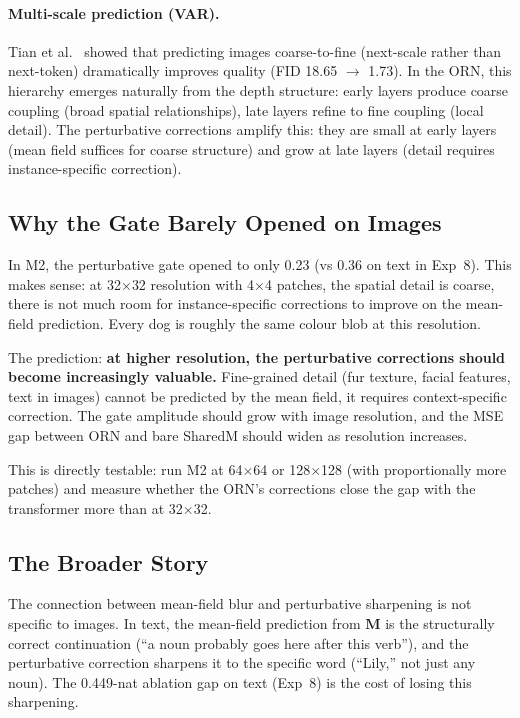 \documentclass[11pt, a4paper]{article}
\newcommand{\M}{\mathbf{M}}
\theoremstyle{plain}
\theoremstyle{remark}
\begin{document}
\paragraph{Multi-scale prediction (VAR).}
Tian et al.~\cite{tian2024var} showed that predicting images coarse-to-fine (next-scale rather than next-token) dramatically improves quality (FID 18.65 $\to$ 1.73).
In the ORN, this hierarchy emerges naturally from the depth structure: early layers produce coarse coupling (broad spatial relationships), late layers refine to fine coupling (local detail).
The perturbative corrections amplify this: they are small at early layers (mean field suffices for coarse structure) and grow at late layers (detail requires instance-specific correction).

\subsection{Why the Gate Barely Opened on Images}

In M2, the perturbative gate opened to only 0.23 (vs 0.36 on text in Exp~8).
This makes sense: at 32$\times$32 resolution with 4$\times$4 patches, the spatial detail is coarse, there is not much room for instance-specific corrections to improve on the mean-field prediction.
Every dog is roughly the same colour blob at this resolution.

The prediction: \textbf{at higher resolution, the perturbative corrections should become increasingly valuable.}
Fine-grained detail (fur texture, facial features, text in images) cannot be predicted by the mean field, it requires context-specific correction.
The gate amplitude should grow with image resolution, and the MSE gap between ORN and bare SharedM should widen as resolution increases.

This is directly testable: run M2 at 64$\times$64 or 128$\times$128 (with proportionally more patches) and measure whether the ORN's corrections close the gap with the transformer more than at 32$\times$32.

\subsection{The Broader Story}

The connection between mean-field blur and perturbative sharpening is not specific to images.
In text, the mean-field prediction from $\M$ is the structurally correct continuation (``a noun probably goes here after this verb''), and the perturbative correction sharpens it to the specific word (``Lily,'' not just any noun).
The 0.449-nat ablation gap on text (Exp~8) is the cost of losing this sharpening.
\end{document}
